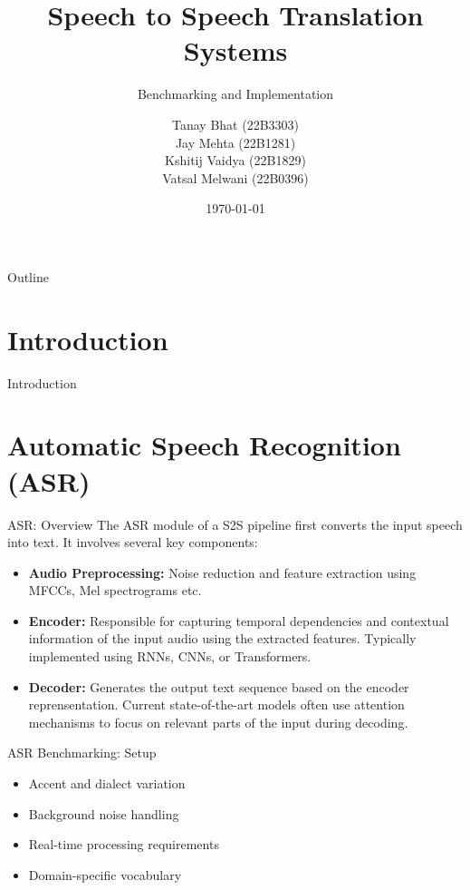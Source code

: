 \documentclass{beamer}
\title[S2S Translation]{Speech to Speech Translation Systems}
\subtitle{Benchmarking and Implementation}
\author[Tanay, Jay, Kshitij, Vatsal]{Tanay Bhat  (22B3303) \\ Jay Mehta (22B1281) \\ Kshitij Vaidya (22B1829) \\ Vatsal Melwani (22B0396)}
\institute[IITB]{IIT Bombay}
\date{\today}
\begin{document}
\begin{frame}
\titlepage
\end{frame}

\begin{frame}{Outline}
\tableofcontents
\end{frame}

\section{Introduction}

\begin{frame}{Introduction}

\end{frame}

\section{Automatic Speech Recognition (ASR)}

\begin{frame}{ASR: Overview}
The ASR module of a S2S pipeline first converts the input speech into text. It involves several key components:
\begin{itemize}
    \item \textbf{Audio Preprocessing:} Noise reduction and feature extraction using MFCCs, Mel spectrograms etc.
    \item \textbf{Encoder:} Responsible for capturing temporal dependencies and contextual information of the input audio using the extracted features. Typically implemented using RNNs, CNNs, or Transformers.
    \item \textbf{Decoder:} Generates the output text sequence based on the encoder reprensentation. Current state-of-the-art models often use attention mechanisms to focus on relevant parts of the input during decoding.
\end{itemize}
\end{frame}

\begin{frame}{ASR Benchmarking: Setup}
\begin{itemize}
\item Accent and dialect variation
\item Background noise handling
\item Real-time processing requirements
\item Domain-specific vocabulary
\end{itemize}
\end{frame}
\end{document}
